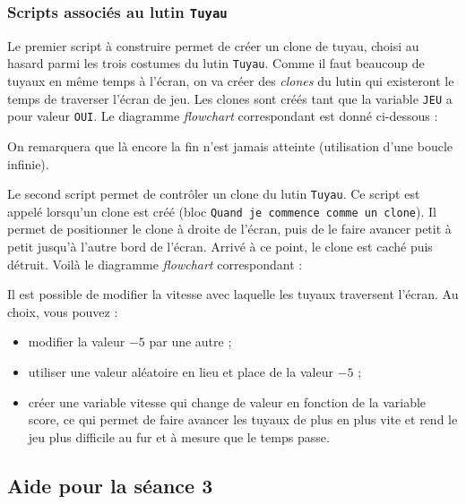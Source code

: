 \newpage 



\subsubsection{Scripts associés au lutin \texttt{Tuyau}}

Le premier script à construire permet de créer un clone de tuyau, choisi au hasard parmi les trois costumes du lutin \texttt{Tuyau}. Comme il faut beaucoup de tuyaux en même temps à l'écran, on va créer des \emph{clones} du lutin qui existeront le temps de traverser l'écran de jeu. Les clones sont créés tant que la variable \texttt{JEU} a pour valeur \texttt{OUI}. Le diagramme \emph{flowchart} correspondant est donné ci-dessous :



On remarquera que là encore la fin n'est jamais atteinte (utilisation d'une boucle infinie).

Le second script permet de contrôler un clone du lutin \texttt{Tuyau}. Ce script est appelé lorsqu'un clone est créé (bloc \texttt{Quand je commence comme un clone}). Il permet de positionner le clone à droite de l'écran, puis de le faire avancer petit à petit jusqu'à l'autre bord de l'écran. Arrivé à ce point, le clone est caché puis détruit. Voilà le diagramme \emph{flowchart} correspondant :



Il est possible de modifier la vitesse avec laquelle les tuyaux traversent l'écran. Au choix, vous pouvez :
\begin{itemize}
\item modifier la valeur $-5$ par une autre ;
\item utiliser une valeur aléatoire en lieu et place de la valeur $-5$ ;
\item créer une variable vitesse qui change de valeur en fonction de la variable score, ce qui permet de faire avancer les tuyaux de plus en plus vite et rend le jeu plus difficile au fur et à mesure que le temps passe.
\end{itemize}



\subsection{Aide pour la séance 3}\label{aide_seanceScratch3}

